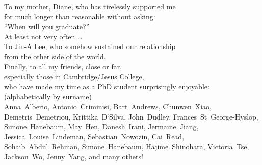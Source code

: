 
\begin{dedication}
To my mother, Diane, who has tirelessly supported me\\
for much longer than reasonable without asking:\\
``When will you graduate?''\\
At least not very often \ldots{}\\
\vspace{0.33\textheight minus 10ex}
To Jin-A Lee, who somehow sustained our relationship\\
from the other side of the world.\\
\vspace{0.11\textheight minus 10ex}
Finally, to all my friends, close or far,\\
especially those in Cambridge/Jesus College,\\
who have made my time as a PhD student surprisingly enjoyable:\\
\vspace{1em}
{\small(alphabetically by surname)}\\
\vspace{0.5em}
Anna~Alberio,
Antonio~Criminisi,
Bart~Andrews,
Chunwen~Xiao,
Demetris~Demetriou,
Krittika~D`Silva,
John~Dudley,
Frances~St~George-Hyslop,
Simone~Hanebaum,
May~Hen,
Danesh~Irani,
Jermaine~Jiang,
Jessica~Louise~Lindeman,
Sebastian~Nowozin,
Cai~Read,
Sohaib~Abdul~Rehman,
Simone~Hanebaum,
Hajime~Shinohara,
Victoria~Tse,
Jackson~Wo,
Jenny~Yang,
and many others!
\end{dedication}